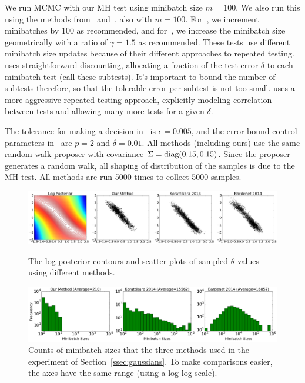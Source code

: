 \documentclass[twoside]{article} \usepackage{aistats2017}
\begin{document}
We run MCMC with our MH test using minibatch size $m=100$.  We also run this
using the methods from~\citet{cutting_mh_2014} %
and~\citet{icml2014c1_bardenet14}, also with $m=100$.
For~\citet{cutting_mh_2014}, we increment minibatches by 100 as recommended, and
for~\citet{icml2014c1_bardenet14}, we increase the minibatch size geometrically
with a ratio of $\gamma = 1.5$ as recommended. These tests use different
minibatch size updates because of their different approaches to repeated
testing. \citet{icml2014c1_bardenet14} uses straightforward discounting,
allocating a fraction of the test error $\delta$ to each minibatch test (call
these subtests). It's important to bound the number of subtests therefore, so
that the tolerable error per subtest is not too small.  \citet{cutting_mh_2014}
uses a more aggressive repeated testing approach, explicitly modeling
correlation between tests and allowing many more tests for a given $\delta$. 

The tolerance for making a decision in~\citet{cutting_mh_2014} is
$\epsilon=0.005$, and the error bound control parameters
in~\citet{icml2014c1_bardenet14} are $p = 2$ and $\delta = 0.01$.  All methods
(including ours) use the same random walk proposer with covariance $\Sigma={\rm
diag}(0.15, 0.15)$.  Since the proposer generates a random walk, all shaping of
distribution of the samples is due to the MH test. All methods are run 5000
times to collect 5000 samples.
\begin{figure}
    \centering
    \includegraphics[width=\linewidth]{GaussianMixtureResult/posterior_of_gaussian.png}
    \caption{
    The log posterior contours and scatter plots of sampled $\theta$ values
    using different methods. 
    }
    \label{fig:gauss_mix_1}
    \centering
    \includegraphics[width=\linewidth]{minibatch_size_gaussian.png}
    \caption{
    Counts of minibatch sizes that the three methods used in the experiment of
    Section~\ref{ssec:gaussians}. To make comparisons easier, the axes have the
    same range (using a log-log scale).
    }
    \label{fig:gauss_mix_2}
\end{figure}
\end{document}

